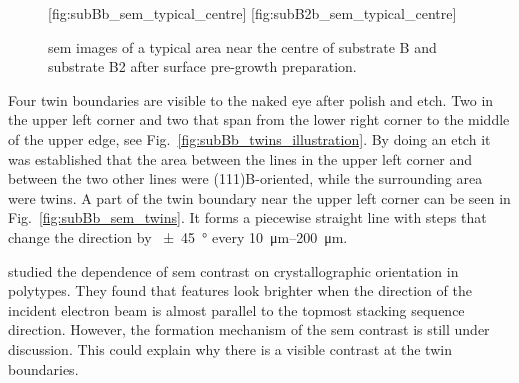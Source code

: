 
\begin{figure}[htbp]
    [fig:subBb_sem_typical_centre]
    \hfill
    [fig:subB2b_sem_typical_centre]
    \caption[\Ac{sem} images of typical areas on substrate B and B2 with surface pre-growth preparation.]{\Ac{sem} images of a typical area near the centre of  substrate B and  substrate B2 after surface pre-growth preparation.}\label{fig:subBb_and_subB2b_sem_typical}
\end{figure}

Four twin boundaries are visible to the naked eye after polish and etch. Two in the upper left corner and two that span from the lower right corner to the middle of the upper edge, see Fig.~\ref{fig:subBb_twins_illustration}. By doing an  etch it was established that the area between the lines in the upper left corner and between the two other lines were (111)B-oriented, while the surrounding area were twins. A part of the twin boundary near the upper left corner can be seen in Fig.~\ref{fig:subBb_sem_twins}. It forms a piecewise straight line with steps that change the direction by \SI{\pm 45}{\degree} every \SIrange{10}{200}{\micro\metre}.

\citet{ashida2015crystallographic} studied the dependence of \ac{sem} contrast on crystallographic orientation in  polytypes. They found that features look brighter when the direction of the incident electron beam is almost parallel to the topmost stacking sequence direction. However, the formation mechanism of the \ac{sem} contrast is still under discussion. This could explain why there is a visible contrast at the twin boundaries.

